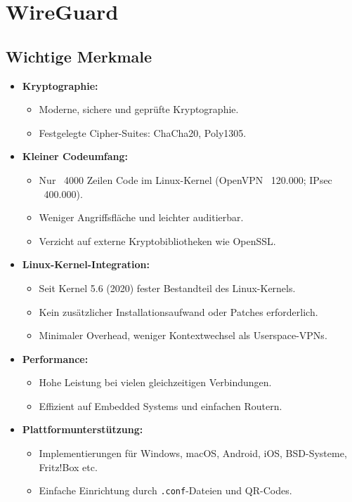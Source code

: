\section{WireGuard}

\subsection{Wichtige Merkmale}
\begin{itemize}
    \item \textbf{Kryptographie:}
    \begin{itemize}
        \item Moderne, sichere und geprüfte Kryptographie.
        \item Festgelegte Cipher-Suites: ChaCha20, Poly1305.
    \end{itemize}
    \item \textbf{Kleiner Codeumfang:}
    \begin{itemize}
        \item Nur ~4000 Zeilen Code im Linux-Kernel (OpenVPN ~120.000; IPsec ~400.000).
        \item Weniger Angriffsfläche und leichter auditierbar.
        \item Verzicht auf externe Kryptobibliotheken wie OpenSSL.
    \end{itemize}
    \item \textbf{Linux-Kernel-Integration:}
    \begin{itemize}
        \item Seit Kernel 5.6 (2020) fester Bestandteil des Linux-Kernels.
        \item Kein zusätzlicher Installationsaufwand oder Patches erforderlich.
        \item Minimaler Overhead, weniger Kontextwechsel als Userspace-VPNs.
    \end{itemize}
    \item \textbf{Performance:}
    \begin{itemize}
        \item Hohe Leistung bei vielen gleichzeitigen Verbindungen.
        \item Effizient auf Embedded Systems und einfachen Routern.
    \end{itemize}
    \item \textbf{Plattformunterstützung:}
    \begin{itemize}
        \item Implementierungen für Windows, macOS, Android, iOS, BSD-Systeme, Fritz!Box etc.
        \item Einfache Einrichtung durch \texttt{.conf}-Dateien und QR-Codes.
    \end{itemize}
\end{itemize}

